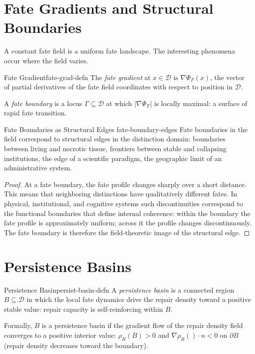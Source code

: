 \documentclass[12pt,twoside,openright]{book}
\providecommand{\fateField}{\Phi_{F}}
\providecommand{\repairDens}[1]{\rho_{R}(#1)}
\begin{document}
\section{Fate Gradients and Structural Boundaries}

A constant fate field is a uniform fate landscape. The
interesting phenomena occur where the field varies.

\begin{definition}{Fate Gradient}{fate-grad-defn}
The \emph{fate gradient} at $x\in\mathcal{D}$ is
$\nabla\fateField(x)$, the vector of partial derivatives of
the fate field coordinates with respect to position in
$\mathcal{D}$.

A \emph{fate boundary} is a locus $\Gamma\subseteq\mathcal{D}$
at which $|\nabla\fateField|$ is locally maximal: a surface
of rapid fate transition.
\end{definition}

\begin{proposition}{Fate Boundaries as Structural Edges}%
  {fate-boundary-edges}
Fate boundaries in the field correspond to structural edges in
the distinction domain: boundaries between living and necrotic
tissue, frontiers between stable and collapsing institutions,
the edge of a scientific paradigm, the geographic limit of an
administrative system.
\begin{proof}
At a fate boundary, the fate profile changes sharply over a
short distance. This means that neighboring distinctions have
qualitatively different fates. In physical, institutional, and
cognitive systems such discontinuities correspond to the
functional boundaries that define internal coherence: within
the boundary the fate profile is approximately uniform; across
it the profile changes discontinuously. The fate boundary is
therefore the field-theoretic image of the structural edge.
\end{proof}
\end{proposition}

\section{Persistence Basins}

\begin{definition}{Persistence Basin}{persist-basin-defn}
A \emph{persistence basin} is a connected region
$B\subseteq\mathcal{D}$ in which the local fate dynamics drive
the repair density toward a positive stable value: repair
capacity is self-reinforcing within $B$.

Formally, $B$ is a persistence basin if the gradient flow of
the repair density field converges to a positive interior
value: $\repairDens{B}>0$ and $\nabla\repairDens{}\cdot n<0$
on $\partial B$ (repair density decreases toward the boundary).
\end{definition}
\end{document}
